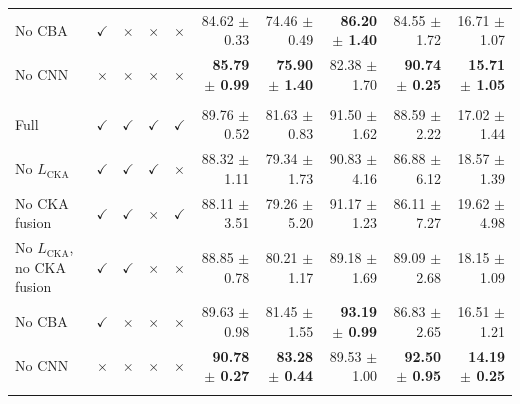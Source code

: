 \documentclass[10pt]{article}
\begin{document}
{\begin{longtable}{lcccc rrrrr}
No CBA & $\checkmark$ & $\times$ & $\times$ & $\times$ & 84.62 $\pm$ 0.33 & 74.46 $\pm$ 0.49 & \textbf{86.20 $\pm$ 1.40} & 84.55 $\pm$ 1.72 & 16.71 $\pm$ 1.07 \\
No CNN & $\times$ & $\times$ & $\times$ & $\times$ & \textbf{85.79 $\pm$ 0.99} & \textbf{75.90 $\pm$ 1.40} & 82.38 $\pm$ 1.70 & \textbf{90.74 $\pm$ 0.25} & \textbf{15.71 $\pm$ 1.05} \\
\addlinespace[4pt]
\multicolumn{10}{l}{\textit{Source: USOVA $\rightarrow$ Target: OVATUS}} \\
\midrule
Full & $\checkmark$ & $\checkmark$ & $\checkmark$ & $\checkmark$ & 89.76 $\pm$ 0.52 & 81.63 $\pm$ 0.83 & 91.50 $\pm$ 1.62 & 88.59 $\pm$ 2.22 & 17.02 $\pm$ 1.44 \\
No $L_{\mathrm{CKA}}$ & $\checkmark$ & $\checkmark$ & $\checkmark$ & $\times$ & 88.32 $\pm$ 1.11 & 79.34 $\pm$ 1.73 & 90.83 $\pm$ 4.16 & 86.88 $\pm$ 6.12 & 18.57 $\pm$ 1.39 \\
No CKA fusion & $\checkmark$ & $\checkmark$ & $\times$ & $\checkmark$ & 88.11 $\pm$ 3.51 & 79.26 $\pm$ 5.20 & 91.17 $\pm$ 1.23 & 86.11 $\pm$ 7.27 & 19.62 $\pm$ 4.98 \\
No $L_{\mathrm{CKA}}$, no CKA fusion & $\checkmark$ & $\checkmark$ & $\times$ & $\times$ & 88.85 $\pm$ 0.78 & 80.21 $\pm$ 1.17 & 89.18 $\pm$ 1.69 & 89.09 $\pm$ 2.68 & 18.15 $\pm$ 1.09 \\
No CBA & $\checkmark$ & $\times$ & $\times$ & $\times$ & 89.63 $\pm$ 0.98 & 81.45 $\pm$ 1.55 & \textbf{93.19 $\pm$ 0.99} & 86.83 $\pm$ 2.65 & 16.51 $\pm$ 1.21 \\
No CNN & $\times$ & $\times$ & $\times$ & $\times$ & \textbf{90.78 $\pm$ 0.27} & \textbf{83.28 $\pm$ 0.44} & 89.53 $\pm$ 1.00 & \textbf{92.50 $\pm$ 0.95} & \textbf{14.19 $\pm$ 0.25} \\
\addlinespace[4pt]
\end{longtable}
}
\end{document}
